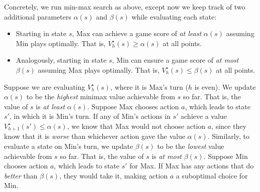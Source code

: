 \documentclass[
  letterpaper,
  DIV=11,
  numbers=noendperiod]{scrreprt}
\providecommand{\tightlist}{%
  \setlength{\itemsep}{0pt}\setlength{\parskip}{0pt}}\usepackage{longtable,booktabs,array}
\theoremstyle{plain}
\theoremstyle{plain}
\theoremstyle{definition}
\theoremstyle{definition}
\theoremstyle{remark}
\begin{document}
Concretely, we run min-max search as above, except now we keep track of
two additional parameters \(\alpha(s)\) and \(\beta(s)\) while
evaluating each state:

\begin{itemize}
\tightlist
\item
  Starting in state \(s\), Max can achieve a game score of \emph{at
  least} \(\alpha(s)\) assuming Min plays optimally. That is,
  \(V^\star_h(s) \ge \alpha(s)\) at all points.
\item
  Analogously, starting in state \(s\), Min can ensure a game score of
  \emph{at most} \(\beta(s)\) assuming Max plays optimally. That is,
  \(V^\star_h(s) \le \beta(s)\) at all points.
\end{itemize}

Suppose we are evaluating \(V^\star_h(s)\), where it is Max's turn
(\(h\) is even). We update \(\alpha(s)\) to be the \emph{highest}
minimax value achievable from \(s\) so far. That is, the value of \(s\)
is \emph{at least} \(\alpha(s)\). Suppose Max chooses action \(a\),
which leads to state \(s'\), in which it is Min's turn. If any of Min's
actions in \(s'\) achieve a value \(V^\star_{h+1}(s') \le \alpha(s)\),
we know that Max would not choose action \(a\), since they know that it
is \emph{worse} than whichever action gave the value \(\alpha(s)\).
Similarly, to evaluate a state on Min's turn, we update \(\beta(s)\) to
be the \emph{lowest} value achievable from \(s\) so far. That is, the
value of \(s\) is \emph{at most} \(\beta(s)\). Suppose Min chooses
action \(a\), which leads to state \(s'\) for Max. If Max has any
actions that do \emph{better} than \(\beta(s)\), they would take it,
making action \(a\) a suboptimal choice for Min.
\end{document}
